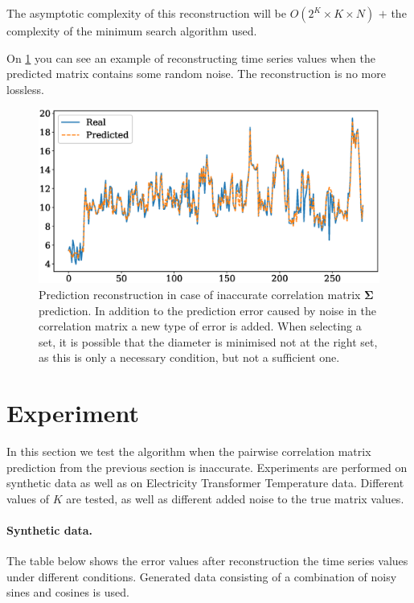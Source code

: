 \documentclass[12pt]{article}
\begin{document}
{The asymptotic complexity of this reconstruction will be $O(2^K \times K \times N)$ $+$ the complexity of the minimum search algorithm used.

On \ref{fig:fig4} you can see an example of reconstructing time series values when the predicted matrix contains some random noise. The reconstruction is no more lossless.

\begin{figure}[!htbp]
	\centering
	\includegraphics[width=\textwidth]{NonIdealRecovery.eps}
	\caption{Prediction reconstruction in case of inaccurate correlation matrix $\mathbf{\Sigma}$ prediction. In addition to the prediction error caused by noise in the correlation matrix a new type of error is added. When selecting a set, it is possible that the diameter is minimised not at the right set, as this is only a necessary condition, but not a sufficient one.}
	\label{fig:fig4}
\end{figure}

\section{Experiment}

In this section we test the algorithm when the pairwise correlation matrix prediction from the previous section is inaccurate. Experiments are performed on synthetic data as well as on Electricity Transformer Temperature \cite{haoyietal-informer-2021} data. Different values of $K$ are tested, as well as different added noise to the true matrix values.

\paragraph{Synthetic data.} The table below shows the error values after reconstruction the time series values under different conditions. Generated data consisting of a combination of noisy sines and cosines is used.

}
\end{document}
